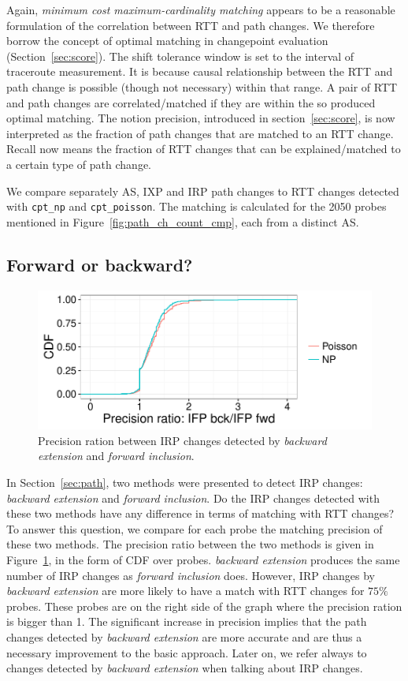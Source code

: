 Again, \textit{minimum cost maximum-cardinality matching} appears to be a reasonable formulation of the correlation between RTT and path changes.
We therefore borrow the concept of optimal matching in changepoint evaluation (Section~\ref{sec:score}).
The shift tolerance window is set to the interval of traceroute measurement.
It is because causal relationship between the RTT and path change is possible (though not necessary) within that range.
A pair of RTT and path changes are correlated/matched if they are within the so produced optimal matching.
The notion precision, introduced in section~\ref{sec:score}, is now interpreted as the fraction of path changes that are matched to an RTT change.
Recall now means the fraction of RTT changes that can be explained/matched to a certain type of path change.

We compare separately AS, IXP and \ac{IRP} path changes to RTT changes detected with \texttt{cpt\_np} and \texttt{cpt\_poisson}.
The matching is calculated for the 2050 probes mentioned in Figure~\ref{fig:path_ch_count_cmp}, each from a distinct AS.


\subsection{Forward or backward?}
\begin{figure}[!htb]
\centering
\includegraphics[width=.72\textwidth]{gfx/chap4/ifp_bck_ch_precision_gain_cdf.pdf}
\caption{Precision ration between IRP changes detected by \textit{backward extension} and \textit{forward inclusion}.}
\label{fig:IRP_bck_ch_precision_gain_cdf}
\end{figure}

In Section~\ref{sec:path}, two methods were presented to detect \ac{IRP} changes: \textit{backward extension} and \textit{forward inclusion}.
Do the \ac{IRP} changes detected with these two methods have any difference in terms of matching with RTT changes?
To answer this question, we compare for each probe the matching precision of these two methods.
The precision ratio between the two methods is given in Figure~\ref{fig:IRP_bck_ch_precision_gain_cdf}, in the form of CDF over probes.
\textit{backward extension} produces the same number of \ac{IRP} changes as \textit{forward inclusion} does.
However, \ac{IRP} changes by \textit{backward extension} are more likely to have a match with RTT changes for $75\%$ probes.
These probes are on the right side of the graph where the precision ration is bigger than 1.	
The significant increase in precision implies that the path changes detected by \textit{backward extension} are more accurate and are thus a necessary improvement to the basic approach.
Later on, we refer always to changes detected by \textit{backward extension} when talking about \ac{IRP} changes.

